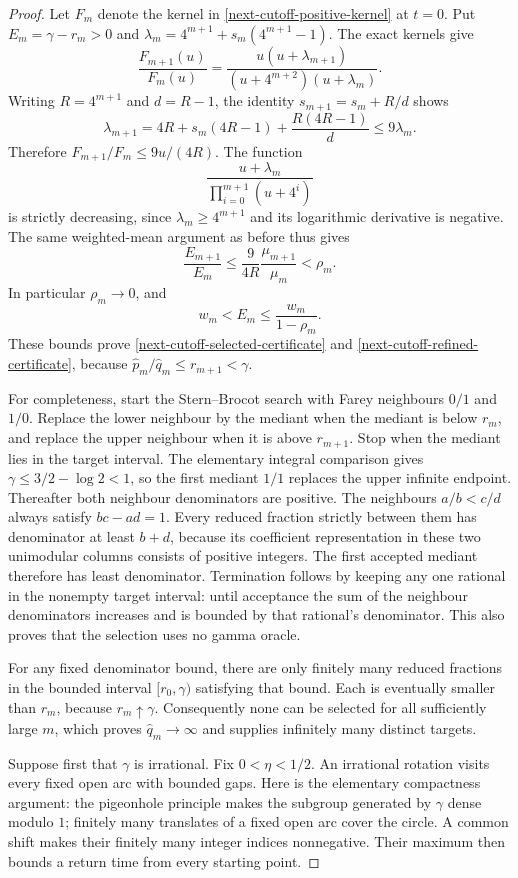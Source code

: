 \documentclass[11pt,a4paper]{article}
\theoremstyle{definition}
\theoremstyle{remark}
\begin{document}
\begin{proof}
Let $F_m$ denote the kernel in \eqref{next-cutoff-positive-kernel} at
$t=0$. Put $E_m=\gamma-r_m>0$ and
$\lambda_m=4^{m+1}+s_m(4^{m+1}-1)$. The exact kernels give
\[
 \frac{F_{m+1}(u)}{F_m(u)}
 =\frac{u(u+\lambda_{m+1})}
 {(u+4^{m+2})(u+\lambda_m)}.
\]
Writing $R=4^{m+1}$ and $d=R-1$, the identity
$s_{m+1}=s_m+R/d$ shows
\[
 \lambda_{m+1}
 =4R+s_m(4R-1)+\frac{R(4R-1)}d
 \le9\lambda_m.
\]
Therefore $F_{m+1}/F_m\le9u/(4R)$.
The function
\[
 \frac{u+\lambda_m}{\prod_{i=0}^{m+1}(u+4^i)}
\]
is strictly decreasing, since $\lambda_m\ge4^{m+1}$ and its logarithmic
derivative is negative. The same weighted-mean argument as before thus
gives
\[
 \frac{E_{m+1}}{E_m}
 \le\frac9{4R}\frac{\mu_{m+1}}{\mu_m}<\rho_m.
\]
In particular $\rho_m\to0$, and
\[
 w_m<E_m\le\frac{w_m}{1-\rho_m}.
\]
These bounds prove \eqref{next-cutoff-selected-certificate} and
\eqref{next-cutoff-refined-certificate}, because
$\widehat p_m/\widehat q_m\le r_{m+1}<\gamma$.

For completeness, start the Stern--Brocot search with Farey neighbours
$0/1$ and $1/0$. Replace the lower neighbour by the mediant when the
mediant is below $r_m$, and replace the upper neighbour when it is above
$r_{m+1}$. Stop when the mediant lies in the target interval.
The elementary integral comparison gives $\gamma\le3/2-\log2<1$,
so the first mediant $1/1$ replaces the upper infinite endpoint.
Thereafter both neighbour denominators are positive.
The neighbours $a/b<c/d$ always satisfy $bc-ad=1$.
Every reduced fraction strictly between them has denominator at least
$b+d$, because its coefficient representation in these two unimodular
columns consists of positive integers. The first accepted mediant
therefore has least denominator. Termination follows by keeping any one
rational in the nonempty target interval: until acceptance the sum of
the neighbour denominators increases and is bounded by that rational's
denominator. This also proves that the selection uses no gamma oracle.

For any fixed denominator bound, there are only finitely many reduced
fractions in the bounded interval $[r_0,\gamma)$ satisfying that bound.
Each is eventually smaller than $r_m$, because $r_m\uparrow\gamma$.
Consequently none can be selected for all sufficiently large $m$, which
proves $\widehat q_m\to\infty$ and supplies infinitely many distinct targets.

Suppose first that $\gamma$ is irrational. Fix $0<\eta<1/2$.
An irrational rotation visits every fixed open arc with bounded gaps.
Here is the elementary compactness argument: the pigeonhole principle
makes the subgroup generated by $\gamma$ dense modulo $1$; finitely many
translates of a fixed open arc cover the circle. A common shift makes
their finitely many integer indices nonnegative. Their maximum then
bounds a return time from every starting point.


\end{proof}
\end{document}
